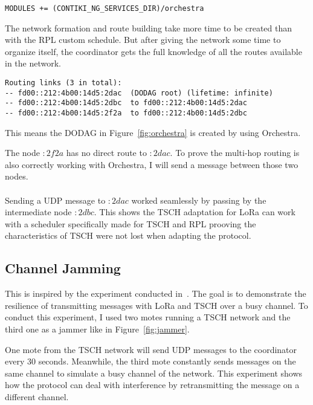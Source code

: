 \begin{lstlisting}
MODULES += (CONTIKI_NG_SERVICES_DIR)/orchestra
\end{lstlisting}

The network formation and route building take more time to be created than with
the RPL custom schedule.
But after giving the network some time to organize itself, the coordinator gets
the full knowledge of all the routes available in the network.

\begin{lstlisting}
Routing links (3 in total):
-- fd00::212:4b00:14d5:2dac  (DODAG root) (lifetime: infinite)
-- fd00::212:4b00:14d5:2dbc  to fd00::212:4b00:14d5:2dac
-- fd00::212:4b00:14d5:2f2a  to fd00::212:4b00:14d5:2dbc
\end{lstlisting}

This means the DODAG in Figure~\ref{fig:orchestra} is created by using Orchestra.



The node $:2f2a$ has no direct route to $:2dac$.
To prove the multi-hop routing is also correctly working with Orchestra, I will
send a message between those two nodes.

\paragraph{}

Sending a UDP message to $:2dac$ worked seamlessly by passing by the
intermediate node $:2dbc$.
This shows the TSCH adaptation for LoRa can work with a scheduler specifically
made for TSCH and RPL prooving the characteristics of TSCH were not lost when
adapting the protocol.

\subsection{Channel Jamming\label{section:jamming}}

This is inspired by the experiment conducted in~\cite{tschoverlora}.
The goal is to demonstrate the resilience of transmitting messages with LoRa and
TSCH over a busy channel.
To conduct this experiment, I used two motes running a TSCH network and the third one
as a jammer like in Figure~\ref{fig:jammer}.



One mote from the TSCH network will send UDP messages to the coordinator
every 30 seconds.
Meanwhile, the third mote constantly sends messages on the same channel to
simulate a busy channel of the network.
This experiment shows how the protocol can deal with interference by retransmitting
the message on a different channel.

